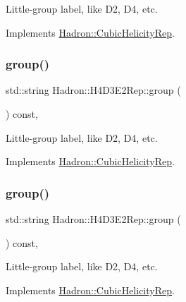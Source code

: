 Little-\/group label, like D2, D4, etc. 

Implements \mbox{\hyperlink{structHadron_1_1CubicHelicityRep_a101a7d76cd8ccdad0f272db44b766113}{Hadron\+::\+Cubic\+Helicity\+Rep}}.

\mbox{\label{structHadron_1_1H4D3E2Rep_a362911306406bcb51e8c6865513d5c44}} 
\subsubsection{\texorpdfstring{group()}{group()}\hspace{0.1cm}{\footnotesize\ttfamily [3/5]}}
{\footnotesize\ttfamily std\+::string Hadron\+::\+H4\+D3\+E2\+Rep\+::group (\begin{DoxyParamCaption}{ }\end{DoxyParamCaption}) const\hspace{0.3cm}{\ttfamily [inline]}, {\ttfamily [virtual]}}

Little-\/group label, like D2, D4, etc. 

Implements \mbox{\hyperlink{structHadron_1_1CubicHelicityRep_a101a7d76cd8ccdad0f272db44b766113}{Hadron\+::\+Cubic\+Helicity\+Rep}}.

\mbox{\label{structHadron_1_1H4D3E2Rep_a362911306406bcb51e8c6865513d5c44}} 
\subsubsection{\texorpdfstring{group()}{group()}\hspace{0.1cm}{\footnotesize\ttfamily [4/5]}}
{\footnotesize\ttfamily std\+::string Hadron\+::\+H4\+D3\+E2\+Rep\+::group (\begin{DoxyParamCaption}{ }\end{DoxyParamCaption}) const\hspace{0.3cm}{\ttfamily [inline]}, {\ttfamily [virtual]}}

Little-\/group label, like D2, D4, etc. 

Implements \mbox{\hyperlink{structHadron_1_1CubicHelicityRep_a101a7d76cd8ccdad0f272db44b766113}{Hadron\+::\+Cubic\+Helicity\+Rep}}.

\mbox{\label{structHadron_1_1H4D3E2Rep_a362911306406bcb51e8c6865513d5c44}} 

